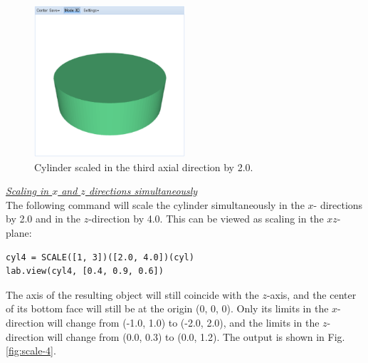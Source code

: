 \documentclass[article,A4,12pt]{llncs}
\begin{document}
\newpage

\begin{figure}[!ht]
\begin{center}
\includegraphics[width=0.5\textwidth]{img/scale-3.png}
\end{center}
\vspace{-2mm}
\caption{Cylinder scaled in the third axial direction by 2.0.}
\label{fig:scale-3}
\end{figure}

\noindent
\underline{\em Scaling in $x$ and $z$ directions simultaneously}\\

The following command will 
scale the cylinder simultaneously in the $x$- directions by 2.0 and in the $z$-direction by 4.0.
This can be viewed as scaling in the $xz$-plane:

\begin{verbatim}
cyl4 = SCALE([1, 3])([2.0, 4.0])(cyl)
lab.view(cyl4, [0.4, 0.9, 0.6])
\end{verbatim}
The axis of the resulting object will still
coincide with the $z$-axis, and the center of its bottom face will
still be at the origin (0, 0, 0). Only its limits in the $x$-direction 
will change from (-1.0, 1.0) to (-2.0, 2.0), and the limits in the 
$z$-direction will change 
from (0.0, 0.3) to (0.0, 1.2). The output is shown in Fig. \ref{fig:scale-4}.

\newpage
\end{document}
